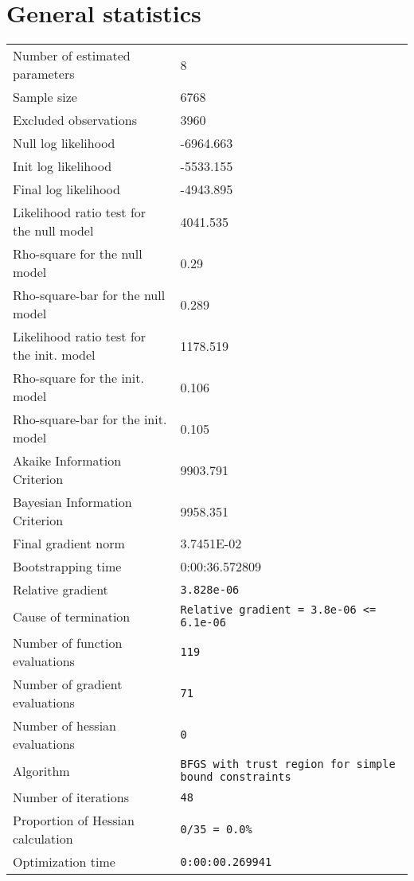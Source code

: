 \documentclass{article}
\begin{document}
\section{General statistics}
\begin{tabular}{ll}
Number of estimated parameters & 8 \\
Sample size & 6768 \\
Excluded observations & 3960 \\
Null log likelihood & -6964.663 \\
Init log likelihood & -5533.155 \\
Final log likelihood & -4943.895 \\
Likelihood ratio test for the null model & 4041.535 \\
Rho-square for the null model & 0.29 \\
Rho-square-bar for the null model & 0.289 \\
Likelihood ratio test for the init. model & 1178.519 \\
Rho-square for the init. model & 0.106 \\
Rho-square-bar for the init. model & 0.105 \\
Akaike Information Criterion & 9903.791 \\
Bayesian Information Criterion & 9958.351 \\
Final gradient norm & 3.7451E-02 \\
Bootstrapping time & 0:00:36.572809 \\
Relative gradient & \verb$3.828e-06$ \\
Cause of termination & \verb$Relative gradient = 3.8e-06 <= 6.1e-06$ \\
Number of function evaluations & \verb$119$ \\
Number of gradient evaluations & \verb$71$ \\
Number of hessian evaluations & \verb$0$ \\
Algorithm & \verb$BFGS with trust region for simple bound constraints$ \\
Number of iterations & \verb$48$ \\
Proportion of Hessian calculation & \verb$0/35 = 0.0%$ \\
Optimization time & \verb$0:00:00.269941$ \\
\end{tabular}
\end{document}
